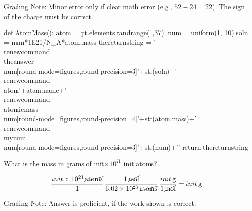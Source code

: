 \begin{solution}
  \ifgradingnotes
 Grading Note: Minor error only if clear math error (e.g., $52 - 24 = 22$). The sign of the charge must be correct.  
\fi
\end{solution}







\begin{pycode}

def AtomMass():
	atom = pt.elements[randrange(1,37)]
	num = uniform(1, 10)
	soln = num*1E21/N_A*atom.mass
	thereturnstring = '\\renewcommand{\\theanswer}{\\num[round-mode=figures,round-precision=3]{'+str(soln)+'}}  \
	\\renewcommand{\\atom}{'+atom.name+'} \
		\\renewcommand{\\atomicmass}{\\num[round-mode=figures,round-precision=4]{'+str(atom.mass)+'}}\
	\\renewcommand{\\mynum}{\\num[round-mode=figures,round-precision=3]{'+str(num)+'}}'
	return thereturnstring

\end{pycode}

\providecommand{\theanswer}{init}
\providecommand{\atom}{init}
\providecommand{\atomicmass}{init}
\providecommand{\mynum}{init} 

\py{AtomMass()}

What is the mass in grams of \mynum$\times 10^{21}$ \atom{} atoms? \answerline[\theanswer{} g]

\begin{solution}
\[
  \frac{\mynum\times 10^{21} \,\cancel{\text{atoms}}}{1}\,
   \frac{1\,\cancel{\text{mol}}}{6.02\times 10^{23}\,\cancel{\text{atoms}}}\,
    \frac{\atomicmass\,\text{g}}{1\,\cancel{\text{mol}}}=\theanswer\,\text{g}
\]

\vspace{2\baselineskip}
  \ifgradingnotes
 Grading Note: Answer is proficient, if the work shown is correct. 
\fi
\end{solution}

